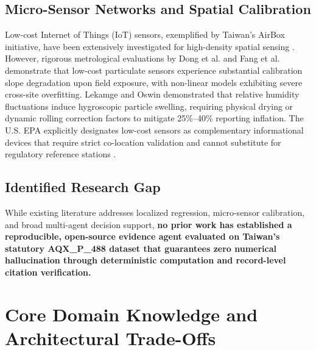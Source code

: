 \documentclass[conference]{IEEEtran}
\begin{document}
\subsection{Micro-Sensor Networks and Spatial Calibration}
Low-cost Internet of Things (IoT) sensors, exemplified by Taiwan's AirBox initiative, have been extensively investigated for high-density spatial sensing \cite{tzeng2023spatially}. However, rigorous metrological evaluations by Dong et al. \cite{dong2025calibration} and Fang et al. \cite{fang2025assessing} demonstrate that low-cost particulate sensors experience substantial calibration slope degradation upon field exposure, with non-linear models exhibiting severe cross-site overfitting. Lekamge and Oswin \cite{lekamge2025exploration} demonstrated that relative humidity fluctuations induce hygroscopic particle swelling, requiring physical drying or dynamic rolling correction factors to mitigate 25\%--40\% reporting inflation. The U.S. EPA explicitly designates low-cost sensors as complementary informational devices that require strict co-location validation and cannot substitute for regulatory reference stations \cite{epa2024sensors}.

\subsection{Identified Research Gap}
While existing literature addresses localized regression, micro-sensor calibration, and broad multi-agent decision support, \textbf{no prior work has established a reproducible, open-source evidence agent evaluated on Taiwan's statutory AQX\_P\_488 dataset that guarantees zero numerical hallucination through deterministic computation and record-level citation verification.}

\section{Core Domain Knowledge and Architectural Trade-Offs}
\end{document}
